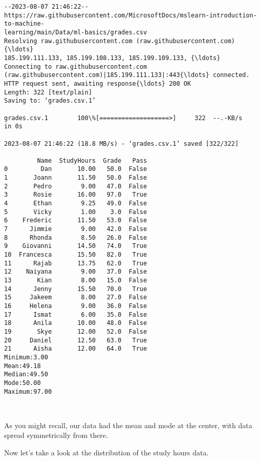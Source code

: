 \documentclass[11pt]{article}
\begin{document}
    \begin{Verbatim}[commandchars=\\\{\}]
--2023-08-07 21:46:22--
https://raw.githubusercontent.com/MicrosoftDocs/mslearn-introduction-to-machine-
learning/main/Data/ml-basics/grades.csv
Resolving raw.githubusercontent.com (raw.githubusercontent.com){\ldots}
185.199.111.133, 185.199.108.133, 185.199.109.133, {\ldots}
Connecting to raw.githubusercontent.com
(raw.githubusercontent.com)|185.199.111.133|:443{\ldots} connected.
HTTP request sent, awaiting response{\ldots} 200 OK
Length: 322 [text/plain]
Saving to: ‘grades.csv.1’

grades.csv.1        100\%[===================>]     322  --.-KB/s    in 0s

2023-08-07 21:46:22 (18.8 MB/s) - ‘grades.csv.1’ saved [322/322]

         Name  StudyHours  Grade   Pass
0         Dan       10.00   50.0  False
1       Joann       11.50   50.0  False
2       Pedro        9.00   47.0  False
3       Rosie       16.00   97.0   True
4       Ethan        9.25   49.0  False
5       Vicky        1.00    3.0  False
6    Frederic       11.50   53.0  False
7      Jimmie        9.00   42.0  False
8      Rhonda        8.50   26.0  False
9    Giovanni       14.50   74.0   True
10  Francesca       15.50   82.0   True
11      Rajab       13.75   62.0   True
12    Naiyana        9.00   37.0  False
13       Kian        8.00   15.0  False
14      Jenny       15.50   70.0   True
15     Jakeem        8.00   27.0  False
16     Helena        9.00   36.0  False
17      Ismat        6.00   35.0  False
18      Anila       10.00   48.0  False
19       Skye       12.00   52.0  False
20     Daniel       12.50   63.0   True
21      Aisha       12.00   64.0   True
Minimum:3.00
Mean:49.18
Median:49.50
Mode:50.00
Maximum:97.00

    \end{Verbatim}

    \begin{center}
    \end{center}
    { \hspace*{\fill} \\}
    
    As you might recall, our data had the mean and mode at the center, with
data spread symmetrically from there.

Now let's take a look at the distribution of the study hours data.
\end{document}
